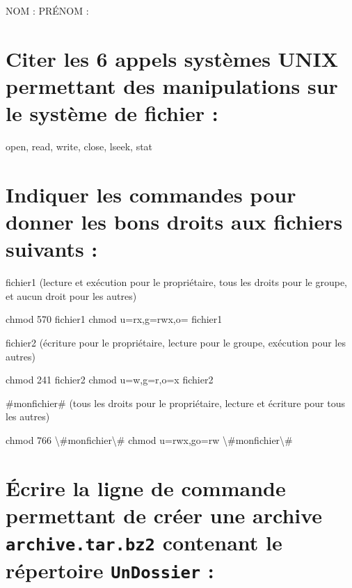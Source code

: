 \documentclass[11pt,a4paper]{article}
\author{Fabrice BOISSIER}
\begin{document}
\setlength{\fboxrule}{2pt}

\noindent {}

\bigskip

NOM : \hspace{6.5cm} PR\'ENOM :

\smallskip

\section{Citer les 6 appels systèmes UNIX permettant des manipulations sur le système de fichier : }

\bigskip
open, read, write, close, lseek, stat
\bigskip

\section{Indiquer les commandes pour donner les bons droits aux fichiers suivants :}

\medskip

\noindent fichier1 (lecture et exécution pour le propriétaire, tous les droits pour le groupe, et aucun droit pour les autres)

\bigskip

chmod 570 fichier1 \qquad chmod u=rx,g=rwx,o= fichier1

\bigskip

\noindent fichier2 (écriture pour le propriétaire, lecture pour le groupe, exécution pour les autres)

\bigskip

chmod 241 fichier2 \qquad chmod u=w,g=r,o=x fichier2

\bigskip

\noindent \#monfichier\# (tous les droits pour le propriétaire, lecture et écriture pour tous les autres)

\bigskip

chmod 766 \textbackslash \#monfichier\textbackslash \# \qquad chmod u=rwx,go=rw \textbackslash \#monfichier\textbackslash \#

\bigskip

\section{\'Ecrire la ligne de commande permettant de créer une archive \newline \texttt{archive.tar.bz2} contenant le répertoire \texttt{UnDossier} : }
\end{document}

